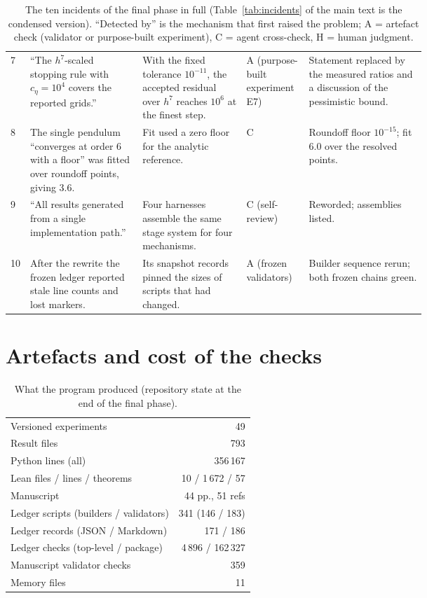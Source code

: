 \begin{table}[t]
\begin{tabularx}{\textwidth}{@{}P{0.02\linewidth}P{0.27\linewidth}P{0.25\linewidth}P{0.15\linewidth}Y@{}}
7 & ``The $h^7$-scaled stopping rule with $c_\eta=10^{4}$ covers the reported grids.'' & With the
fixed tolerance $10^{-11}$, the accepted residual over $h^7$ reaches $10^{6}$ at the finest
step. & A (purpose-built experiment E7) & Statement replaced by the measured ratios and a
discussion of the pessimistic bound. \\
8 & The single pendulum ``converges at order 6 with a floor'' was fitted over roundoff points,
giving 3.6. & Fit used a zero floor for the analytic reference. & C & Roundoff floor $10^{-15}$;
fit 6.0 over the resolved points. \\
9 & ``All results generated from a single implementation path.'' & Four harnesses assemble the
same stage system for four mechanisms. & C (self-review) & Reworded; assemblies listed. \\
10 & After the rewrite the frozen ledger reported stale line counts and lost markers. & Its
snapshot records pinned the sizes of scripts that had changed. & A (frozen validators) & Builder
sequence rerun; both frozen chains green. \\
\bottomrule
\end{tabularx}
\caption{The ten incidents of the final phase in full (Table~\ref{tab:incidents} of the main text is the condensed version). ``Detected by'' is the mechanism that first raised the
problem; A = artefact check (validator or purpose-built experiment), C = agent cross-check, H =
human judgment.}
\label{tab:incidents_full}
\end{table}

\section{Artefacts and cost of the checks}
\label{app:cost}

\begin{table}[H]
\centering
\small
\begin{tabular}{@{}lr@{}}
\toprule
Versioned experiments & 49 \\
Result files & 793 \\
Python lines (all) & 356\,167 \\
Lean files / lines / theorems & 10 / 1\,672 / 57 \\
Manuscript & 44 pp., 51 refs \\
Ledger scripts (builders / validators) & 341 (146 / 183) \\
Ledger records (JSON / Markdown) & 171 / 186 \\
Ledger checks (top-level / package) & 4\,896 / 162\,327 \\
Manuscript validator checks & 359 \\
Memory files & 11 \\
\bottomrule
\end{tabular}
\caption{What the program produced (repository state at the end of the final phase).}
\label{tab:artefacts}
\end{table}

